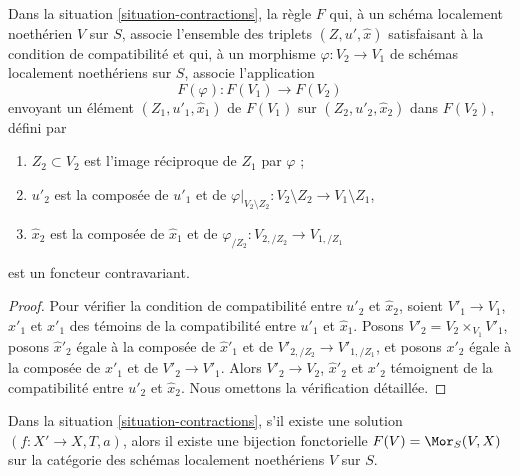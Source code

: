 \begin{lemma}
\label{lemma-functor}
Dans la situation \ref{situation-contractions}, la règle $F$ qui, à un schéma
localement noethérien $V$ sur $S$, associe l'ensemble des triplets
$(Z, u', \hat x)$ satisfaisant à la condition de compatibilité et qui, à un
morphisme $\varphi : V_2 \to V_1$ de schémas localement noethériens sur $S$,
associe l'application
$$
F(\varphi) : F(V_1) \longrightarrow F(V_2)
$$
envoyant un élément $(Z_1, u'_1, \hat x_1)$ de $F(V_1)$ sur
$(Z_2, u'_2, \hat x_2)$ dans $F(V_2)$, défini par
\begin{enumerate}
\item $Z_2 \subset V_2$ est l'image réciproque de $Z_1$ par $\varphi$ ;
\item $u'_2$ est la composée de $u'_1$ et de
$\varphi|_{V_2 \setminus Z_2} : V_2 \setminus Z_2 \to V_1 \setminus Z_1$,
\item $\hat x_2$ est la composée de $\hat x_1$ et de
$\varphi_{/Z_2} : V_{2, /Z_2} \to V_{1, /Z_1}$
\end{enumerate}
est un foncteur contravariant.
\end{lemma}

\begin{proof}
Pour vérifier la condition de compatibilité entre $u'_2$ et $\hat x_2$, soient
$V'_1 \to V_1$, $\hat x'_1$ et $x'_1$ des témoins de la compatibilité entre
$u'_1$ et $\hat x_1$. Posons $V'_2 = V_2 \times_{V_1} V'_1$, posons
$\hat x'_2$ égale à la composée de $\hat x'_1$ et de
$V'_{2, /Z_2} \to V'_{1, /Z_1}$, et posons $x'_2$
égale à la composée de $x'_1$ et de $V'_2 \to V'_1$.
Alors $V'_2 \to V_2$, $\hat x'_2$ et $x'_2$ témoignent de la compatibilité
entre $u'_2$ et $\hat x_2$. Nous omettons la vérification détaillée.
\end{proof}

\begin{lemma}
\label{lemma-solution}
Dans la situation \ref{situation-contractions}, s'il existe une solution
$(f : X' \to X, T, a)$, alors il existe une bijection fonctorielle
$F(V) = \Mor_S(V, X)$ sur la catégorie des schémas localement noethériens
$V$ sur $S$.
\end{lemma}

